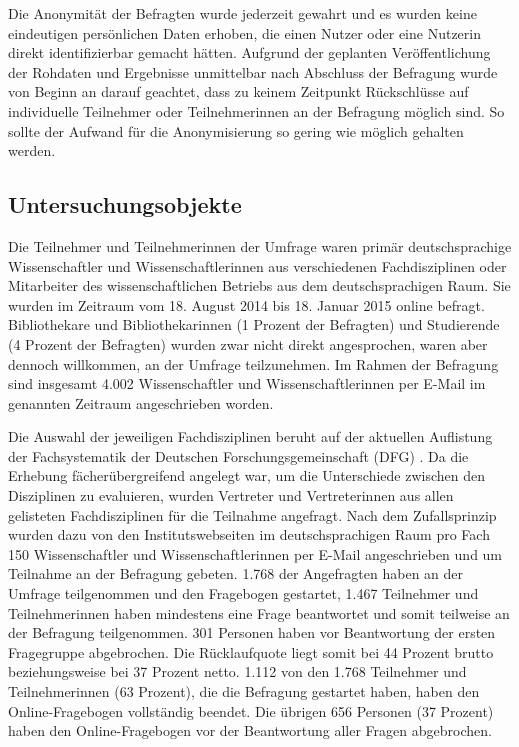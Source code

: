 Die Anonymität der Befragten wurde jederzeit gewahrt und es wurden keine eindeutigen persönlichen Daten erhoben, die einen Nutzer oder eine Nutzerin direkt identifizierbar gemacht hätten. Aufgrund der geplanten Veröffentlichung der Rohdaten und Ergebnisse unmittelbar nach Abschluss der Befragung wurde von Beginn an darauf geachtet, dass zu keinem Zeitpunkt Rückschlüsse auf individuelle Teilnehmer oder Teilnehmerinnen an der Befragung möglich sind. So sollte der Aufwand für die Anonymisierung so gering wie möglich gehalten werden.

\subsection{Untersuchungsobjekte}

Die Teilnehmer und Teilnehmerinnen der Umfrage waren primär deutschsprachige Wissenschaftler und Wissenschaftlerinnen aus verschiedenen Fachdisziplinen oder Mitarbeiter des wissenschaftlichen Betriebs aus dem deutschsprachigen Raum. Sie wurden im Zeitraum vom 18. August 2014 bis 18. Januar 2015 online befragt. Bibliothekare und Bibliothekarinnen (1 Prozent der Befragten) und Studierende (4 Prozent der Befragten) wurden zwar nicht direkt angesprochen, waren aber dennoch willkommen, an der Umfrage teilzunehmen. Im Rahmen der Befragung sind insgesamt 4.002 Wissenschaftler und Wissenschaftlerinnen per E-Mail im genannten Zeitraum angeschrieben worden.

Die Auswahl der jeweiligen Fachdisziplinen beruht auf der aktuellen Auflistung der Fachsystematik der Deutschen Forschungsgemeinschaft (DFG) \cite{suchen_Webseite_DFG}. Da die Erhebung fächerübergreifend angelegt war, um die Unterschiede zwischen den Disziplinen zu evaluieren, wurden Vertreter und Vertreterinnen aus allen gelisteten Fachdisziplinen für die Teilnahme angefragt. Nach dem Zufallsprinzip wurden dazu von den Institutswebseiten im deutschsprachigen Raum pro Fach 150 Wissenschaftler und Wissenschaftlerinnen per E-Mail angeschrieben und um Teilnahme an der Befragung gebeten. 1.768 der Angefragten haben an der Umfrage teilgenommen und den Fragebogen gestartet, 1.467 Teilnehmer und Teilnehmerinnen haben mindestens eine Frage beantwortet und somit teilweise an der Befragung teilgenommen. 301 Personen haben vor Beantwortung der ersten Fragegruppe abgebrochen. Die Rücklaufquote liegt somit bei 44 Prozent brutto beziehungsweise bei 37 Prozent netto. 1.112 von den 1.768 Teilnehmer und Teilnehmerinnen (63 Prozent), die die Befragung gestartet haben, haben den Online-Fragebogen vollständig beendet. Die übrigen 656 Personen (37 Prozent) haben den Online-Fragebogen vor der Beantwortung aller Fragen abgebrochen.


